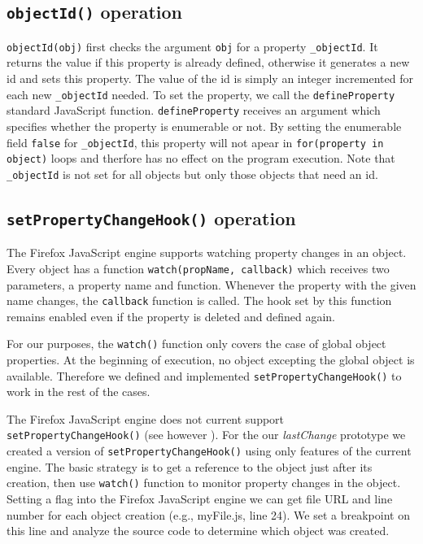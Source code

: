 \documentclass[preprint]{sigplanconf}
\begin{document}
\subsection{\texttt{objectId()} operation}
\texttt{objectId(obj)} first checks the argument \texttt{obj} for a property \texttt{\_objectId}.
It returns the value if this property is already defined,
otherwise it generates a new id and sets this property. The value of the id is simply an integer incremented 
for each new \texttt{\_objectId} needed. To set %
the property, we call the \texttt{defineProperty} standard JavaScript
function. \texttt{defineProperty} receives an argument which specifies
whether the property is enumerable or not. By setting the enumerable
field \texttt{false} for \texttt{\_objectId}, this property will not
apear in \texttt{for(property in object)} loops and therfore has no
effect on the program execution. Note that \texttt{\_objectId} is
not set for all objects but only those objects that need an id.

\subsection{\texttt{setPropertyChangeHook()} operation}
The Firefox JavaScript engine supports watching property changes in an
object. Every object has a function \texttt{watch(propName, callback)}
which receives two parameters, a property name and function.  Whenever
the property with the given name changes, the \texttt{callback} function is
called. The hook set by this function remains enabled even if the
property is deleted and defined again. 

For our purposes, the \texttt{watch()} function only covers the case
of global object properties. At the beginning of execution, no object
excepting the global object is available. Therefore we defined and
implemented \texttt{setPropertyChangeHook()} to work in the rest of
the cases. 

The Firefox JavaScript engine does not current support
\texttt{setPropertyChangeHook()} (see however \cite{bugzilla}).  For
the our \textit{lastChange} prototype we created a version of
\texttt{setPropertyChangeHook()} using only features of the current
engine.  The basic strategy is to get a reference to the object just
after its creation, then use \texttt{watch()} function to monitor
property changes in the object.  Setting a flag into the Firefox
JavaScript engine we can get file URL and line number for each object
creation (e.g., myFile.js, line 24). We set a breakpoint on this line
and analyze the source code to determine which object was created.
 
\end{document}
